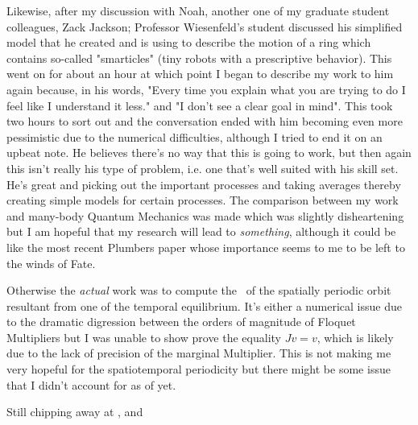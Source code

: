 \begin{description}
{\begin{description}
Likewise, after my discussion with Noah, another one of my graduate student colleagues, Zack Jackson; Professor
Wiesenfeld's student discussed his simplified model that he created and is using to describe the motion
of a ring which contains so-called "smarticles" (tiny robots with a prescriptive behavior). This went
on for about an hour at which point I began to describe my work to him again because, in his words,
"Every time you explain what you are trying to do I feel like I understand it less." and "I don't see
a clear goal in mind". This took two hours to sort out and the conversation ended with him becoming
even more pessimistic due to the numerical difficulties, although I tried to end it on an upbeat note.
He believes there's no way that this is going to work, but then again this isn't really his type of problem,
i.e. one that's well suited with his skill set. He's great and picking out the important processes and taking
averages thereby creating simple models for certain processes. The comparison between my work and many-body
Quantum Mechanics was made which was slightly disheartening but I am hopeful that my research will lead to
\emph{something}, although it could be like the most recent Plumbers paper whose importance seems to me
to be left to the winds of Fate.

\item[actual work]
Otherwise the \emph{actual} work was to compute the \jacobianM\ of the spatially periodic orbit resultant
from one of the temporal equilibrium. It's either a numerical issue due to the dramatic digression between
the orders of magnitude of Floquet Multipliers but I was unable to show prove the equality $Jv = v$, which
is likely due to the lack of precision of the marginal Multiplier. This is not making me very hopeful
for the spatiotemporal periodicity but there might be some issue that I didn't account for as of yet.

\item[Readings]
Still chipping away at , and 
\end{description}
}


\end{description}
